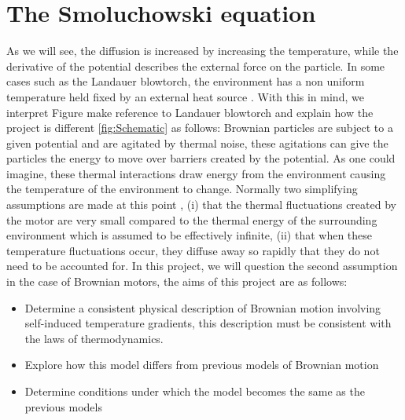 \section{The Smoluchowski equation} \label{Smoluchowski}

As we will see, the diffusion is increased by increasing the temperature, while the derivative of the potential describes the external force on the particle. In some cases such as the Landauer blowtorch, the environment has a non uniform temperature held fixed by an external heat source \cite{Landauer1988}. With this in mind, we interpret Figure {\color{red} make reference to Landauer blowtorch and explain how the project is different} \ref{fig:Schematic} as follows: Brownian particles are subject to a given potential and are agitated by thermal noise, these agitations can give the particles the energy to move over barriers created by the potential. As one could imagine, these thermal interactions draw energy from the environment causing the temperature of the environment to change. Normally two simplifying assumptions are made at this point \cite{Reimann2001}, (i) that the thermal fluctuations created by the motor are very small compared to the thermal energy of the surrounding environment which is assumed to be effectively infinite, (ii) that when these temperature fluctuations occur, they diffuse away so rapidly that they do not need to be accounted for. In this project, we will question the second assumption in the case of Brownian motors, the aims of this project are as follows:
\begin{itemize}
\item{Determine a consistent physical description of Brownian motion involving self-induced temperature gradients, this description must be consistent with the laws of thermodynamics.}
\item{Explore how this model differs from previous models of Brownian motion}
\item{Determine conditions under which the model becomes the same as the previous models}
\end{itemize}


